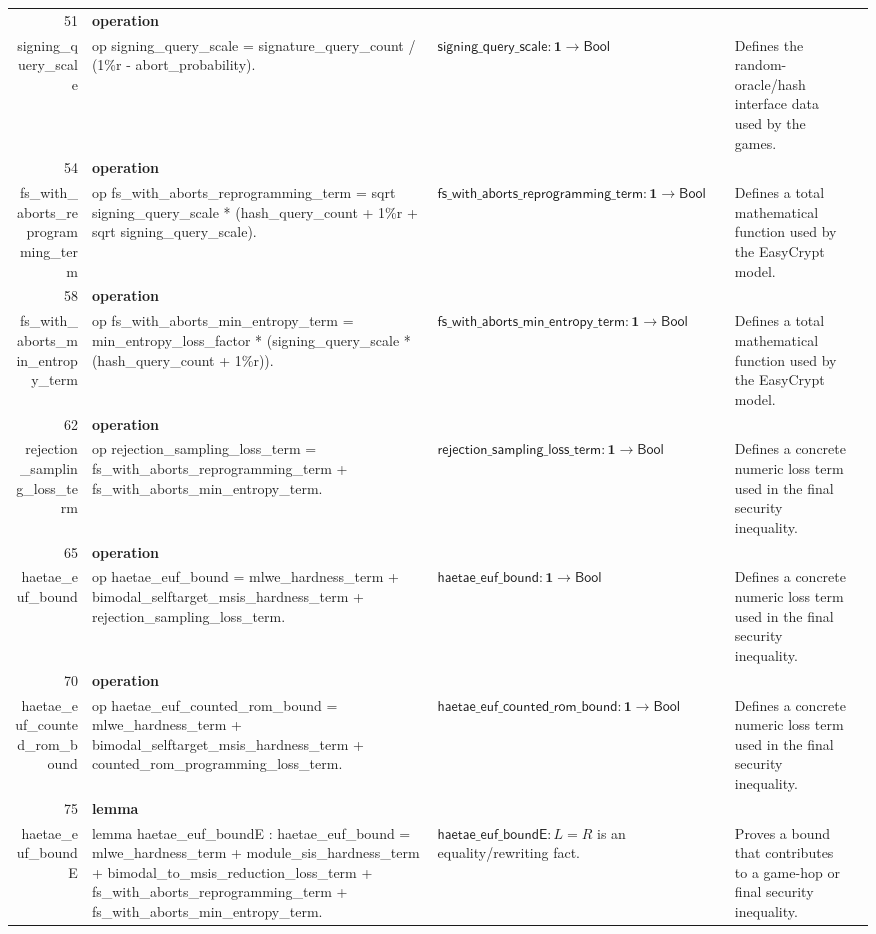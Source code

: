 \documentclass[10pt]{article}
\newcommand{\ec}[1]{\begingroup\ttfamily\scriptsize #1\endgroup}
\begin{document}
\begin{longtable}{r L{0.17\textwidth} L{0.26\textwidth} L{0.27\textwidth} L{0.20\textwidth}}
51 & \textbf{operation}\\\ec{signing\_query\_scale} & \ec{op signing\_query\_scale = signature\_query\_count / (1\%r - abort\_probability).} & \(\mathsf{signing\_query\_scale} : \mathbf{1} \to \mathsf{Bool}\) & Defines the random-oracle/hash interface data used by the games. \\
54 & \textbf{operation}\\\ec{fs\_with\_aborts\_reprogramming\_term} & \ec{op fs\_with\_aborts\_reprogramming\_term = sqrt signing\_query\_scale * (hash\_query\_count + 1\%r + sqrt signing\_query\_scale).} & \(\mathsf{fs\_with\_aborts\_reprogramming\_term} : \mathbf{1} \to \mathsf{Bool}\) & Defines a total mathematical function used by the EasyCrypt model. \\
58 & \textbf{operation}\\\ec{fs\_with\_aborts\_min\_entropy\_term} & \ec{op fs\_with\_aborts\_min\_entropy\_term = min\_entropy\_loss\_factor * (signing\_query\_scale * (hash\_query\_count + 1\%r)).} & \(\mathsf{fs\_with\_aborts\_min\_entropy\_term} : \mathbf{1} \to \mathsf{Bool}\) & Defines a total mathematical function used by the EasyCrypt model. \\
62 & \textbf{operation}\\\ec{rejection\_sampling\_loss\_term} & \ec{op rejection\_sampling\_loss\_term = fs\_with\_aborts\_reprogramming\_term + fs\_with\_aborts\_min\_entropy\_term.} & \(\mathsf{rejection\_sampling\_loss\_term} : \mathbf{1} \to \mathsf{Bool}\) & Defines a concrete numeric loss term used in the final security inequality. \\
65 & \textbf{operation}\\\ec{haetae\_euf\_bound} & \ec{op haetae\_euf\_bound = mlwe\_hardness\_term + bimodal\_selftarget\_msis\_hardness\_term + rejection\_sampling\_loss\_term.} & \(\mathsf{haetae\_euf\_bound} : \mathbf{1} \to \mathsf{Bool}\) & Defines a concrete numeric loss term used in the final security inequality. \\
70 & \textbf{operation}\\\ec{haetae\_euf\_counted\_rom\_bound} & \ec{op haetae\_euf\_counted\_rom\_bound = mlwe\_hardness\_term + bimodal\_selftarget\_msis\_hardness\_term + counted\_rom\_programming\_loss\_term.} & \(\mathsf{haetae\_euf\_counted\_rom\_bound} : \mathbf{1} \to \mathsf{Bool}\) & Defines a concrete numeric loss term used in the final security inequality. \\
75 & \textbf{lemma}\\\ec{haetae\_euf\_boundE} & \ec{lemma haetae\_euf\_boundE : haetae\_euf\_bound = mlwe\_hardness\_term + module\_sis\_hardness\_term + bimodal\_to\_msis\_reduction\_loss\_term + fs\_with\_aborts\_reprogramming\_term + fs\_with\_aborts\_min\_entropy\_term.} & \(\mathsf{haetae\_euf\_boundE} : L = R\) is an equality/rewriting fact. & Proves a bound that contributes to a game-hop or final security inequality. \\

\end{longtable}
\end{document}
